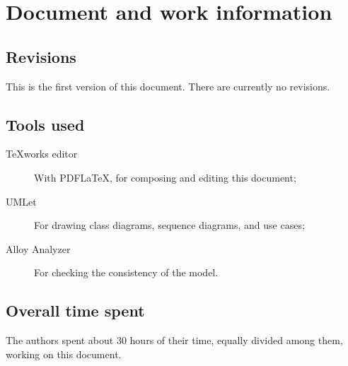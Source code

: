 \chapter{Document and work information}

\section{Revisions}
This is the first version of this document. There are currently no revisions.

\section{Tools used}
\begin{description}
\item[TeXworks editor] With PDF\LaTeX{}, for composing and editing this document;
\item[UMLet] For drawing class diagrams, sequence diagrams, and use cases;
\item[Alloy Analyzer] For checking the consistency of the model.
\end{description}

\section{Overall time spent}
The authors spent about 30 hours of their time, equally divided among them, working on this document.
